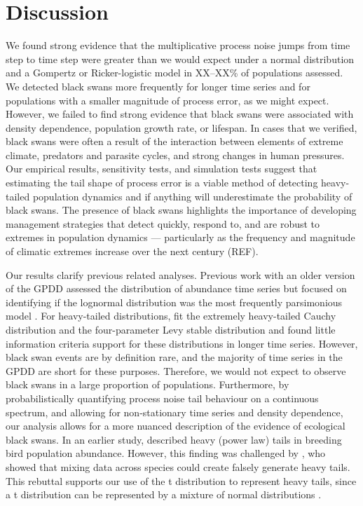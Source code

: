 \section{Discussion}

We found strong evidence that the multiplicative process noise jumps from time
step to time step were greater than we would expect under a normal distribution
and a Gompertz or Ricker-logistic model in XX--XX\% of populations assessed. We
detected black swans more frequently for longer time series and for populations
with a smaller magnitude of process error, as we might expect. However, we
failed to find strong evidence that black swans were associated with density
dependence, population growth rate, or lifespan. In cases that we verified,
black swans were often a result of the interaction between elements of extreme
climate, predators and parasite cycles, and strong changes in human pressures.
Our empirical results, sensitivity tests, and simulation tests suggest that
estimating the tail shape of process error is a viable method of detecting
heavy-tailed population dynamics and if anything will underestimate the
probability of black swans. The presence of black swans highlights the
importance of developing management strategies that detect quickly, respond
to, and are robust to extremes in population dynamics --- particularly as the
frequency and magnitude of climatic extremes increase over the next century
(REF).

Our results clarify previous related analyses. Previous work with an older
version of the GPDD assessed the distribution of abundance time series but
focused on identifying if the lognormal distribution was the most frequently
parsimonious model \citep{halley2002}. For heavy-tailed distributions,
\citet{halley2002} fit the extremely heavy-tailed Cauchy distribution and the
four-parameter Levy stable distribution and found little information criteria
support for these distributions in longer time series. However, black swan
events are by definition rare, and the majority of time series in the GPDD are
short for these purposes. Therefore, we would not expect to observe black swans
in a large proportion of populations. Furthermore, by probabilistically
quantifying process noise tail behaviour on a continuous spectrum, and allowing
for non-stationary time series and density dependence, our analysis allows for
a more nuanced description of the evidence of ecological black swans. In an
earlier study, \citet{keitt1998} described heavy (power law) tails in breeding
bird population abundance. However, this finding was challenged by
\citet{allen2001}, who showed that mixing data across species could create
falsely generate heavy tails. This rebuttal supports our use of the
t distribution to represent heavy tails, since a t distribution can be
represented by a mixture of normal distributions \citep[with
inverse-gamma-distributed variances,][]{gelman2014}.

